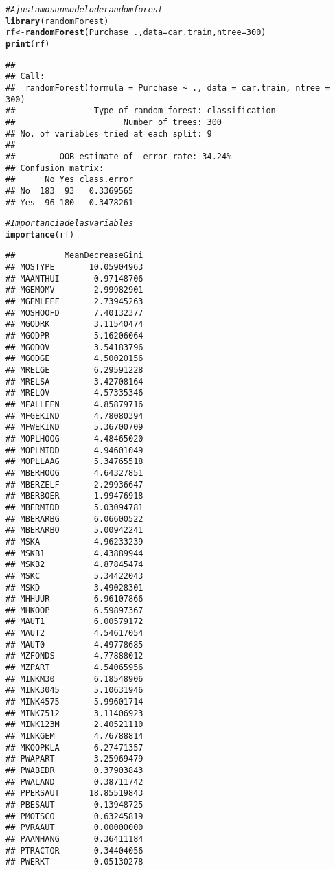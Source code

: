 \documentclass{article}\usepackage[]{graphicx}\usepackage[]{xcolor}
\makeatletter
\newcommand{\hlnum}[1]{\textcolor[rgb]{0.686,0.059,0.569}{#1}}%
\newcommand{\hlcom}[1]{\textcolor[rgb]{0.678,0.584,0.686}{\textit{#1}}}%
\newcommand{\hlopt}[1]{\textcolor[rgb]{0,0,0}{#1}}%
\newcommand{\hlstd}[1]{\textcolor[rgb]{0.345,0.345,0.345}{#1}}%
\newcommand{\hlkwb}[1]{\textcolor[rgb]{0.69,0.353,0.396}{#1}}%
\newcommand{\hlkwc}[1]{\textcolor[rgb]{0.333,0.667,0.333}{#1}}%
\newcommand{\hlkwd}[1]{\textcolor[rgb]{0.737,0.353,0.396}{\textbf{#1}}}%
\newenvironment{kframe}{%
 \def\at@end@of@kframe{}%
 \ifinner\ifhmode%
  \def\at@end@of@kframe{\end{minipage}}%
  \begin{minipage}{\columnwidth}%
 \fi\fi%
 \def\FrameCommand##1{\hskip\@totalleftmargin \hskip-\fboxsep
 \colorbox{shadecolor}{##1}\hskip-\fboxsep
     \hskip-\linewidth \hskip-\@totalleftmargin \hskip\columnwidth}%
 \MakeFramed {\advance\hsize-\width
   \@totalleftmargin\z@ \linewidth\hsize
   \@setminipage}}%
 {\par\unskip\endMakeFramed%
 \at@end@of@kframe}
\newenvironment{knitrout}{}{} %
\makeatother
\begin{document}
\begin{knitrout}
\begin{kframe}
\begin{alltt}
\hlcom{# Ajustamos un modelo de random forest}
\hlkwd{library}\hlstd{(randomForest)}
\hlstd{rf} \hlkwb{<-}\hlkwd{randomForest}\hlstd{(Purchase}\hlopt{~}\hlstd{.,}\hlkwc{data}\hlstd{=car.train,} \hlkwc{ntree}\hlstd{=}\hlnum{300}\hlstd{)}
\hlkwd{print}\hlstd{(rf)}
\end{alltt}
\begin{verbatim}
## 
## Call:
##  randomForest(formula = Purchase ~ ., data = car.train, ntree = 300) 
##                Type of random forest: classification
##                      Number of trees: 300
## No. of variables tried at each split: 9
## 
##         OOB estimate of  error rate: 34.24%
## Confusion matrix:
##      No Yes class.error
## No  183  93   0.3369565
## Yes  96 180   0.3478261
\end{verbatim}
\begin{alltt}
\hlcom{# Importancia de las variables}
\hlkwd{importance}\hlstd{(rf)}
\end{alltt}
\begin{verbatim}
##          MeanDecreaseGini
## MOSTYPE       10.05904963
## MAANTHUI       0.97148706
## MGEMOMV        2.99982901
## MGEMLEEF       2.73945263
## MOSHOOFD       7.40132377
## MGODRK         3.11540474
## MGODPR         5.16206064
## MGODOV         3.54183796
## MGODGE         4.50020156
## MRELGE         6.29591228
## MRELSA         3.42708164
## MRELOV         4.57335346
## MFALLEEN       4.85879716
## MFGEKIND       4.78080394
## MFWEKIND       5.36700709
## MOPLHOOG       4.48465020
## MOPLMIDD       4.94601049
## MOPLLAAG       5.34765518
## MBERHOOG       4.64327851
## MBERZELF       2.29936647
## MBERBOER       1.99476918
## MBERMIDD       5.03094781
## MBERARBG       6.06600522
## MBERARBO       5.00942241
## MSKA           4.96233239
## MSKB1          4.43889944
## MSKB2          4.87845474
## MSKC           5.34422043
## MSKD           3.49028301
## MHHUUR         6.96107866
## MHKOOP         6.59897367
## MAUT1          6.00579172
## MAUT2          4.54617054
## MAUT0          4.49778685
## MZFONDS        4.77888012
## MZPART         4.54065956
## MINKM30        6.18548906
## MINK3045       5.10631946
## MINK4575       5.99601714
## MINK7512       3.11406923
## MINK123M       2.40521110
## MINKGEM        4.76788814
## MKOOPKLA       6.27471357
## PWAPART        3.25969479
## PWABEDR        0.37903843
## PWALAND        0.38711742
## PPERSAUT      18.85519843
## PBESAUT        0.13948725
## PMOTSCO        0.63245819
## PVRAAUT        0.00000000
## PAANHANG       0.36411184
## PTRACTOR       0.34404056
## PWERKT         0.05130278

\end{verbatim}
\end{kframe}
\end{knitrout}
\end{document}

